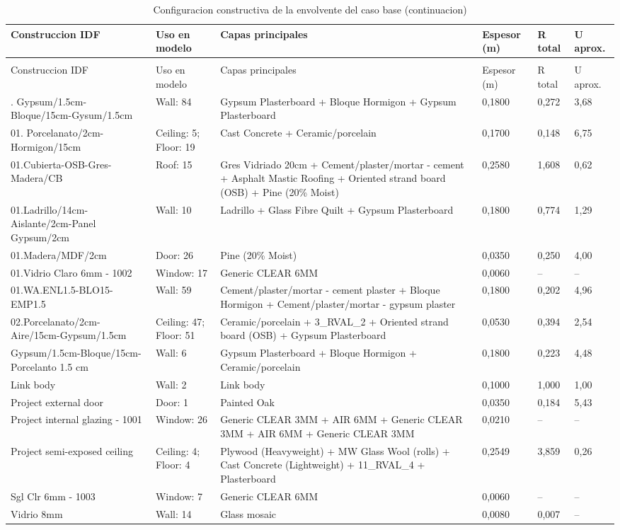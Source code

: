 {\fontsize{8}{10}\selectfont
\begin{longtable}{p{3.2cm}p{2.1cm}p{4.6cm}p{1.4cm}p{1.4cm}p{1.4cm}}
  \caption{Configuracion constructiva de la envolvente del caso base} \\
  \toprule
  Construccion IDF & Uso en modelo & Capas principales & Espesor (m) & R total & U aprox. \\
  \midrule
  \endfirsthead
  \caption[]{Configuracion constructiva de la envolvente del caso base (continuacion)} \\
  \toprule
  Construccion IDF & Uso en modelo & Capas principales & Espesor (m) & R total & U aprox. \\
  \midrule
  \endhead
  \bottomrule
  \endfoot
  01. Gypsum/1.5cm-Bloque/15cm-Gysum/1.5cm & Wall: 84 & Gypsum Plasterboard + Bloque Hormigon + Gypsum Plasterboard & 0,1800 & 0,272 & 3,68 \\
  01. Porcelanato/2cm-Hormigon/15cm & Ceiling: 5; Floor: 19 & Cast Concrete + Ceramic/porcelain & 0,1700 & 0,148 & 6,75 \\
  01.Cubierta-OSB-Gres-Madera/CB & Roof: 15 & Gres Vidriado 20cm + Cement/plaster/mortar - cement + Asphalt Mastic Roofing + Oriented strand board (OSB) + Pine (20\% Moist) & 0,2580 & 1,608 & 0,62 \\
  01.Ladrillo/14cm-Aislante/2cm-Panel Gypsum/2cm & Wall: 10 & Ladrillo + Glass Fibre Quilt + Gypsum Plasterboard & 0,1800 & 0,774 & 1,29 \\
  01.Madera/MDF/2cm & Door: 26 & Pine (20\% Moist) & 0,0350 & 0,250 & 4,00 \\
  01.Vidrio Claro 6mm - 1002 & Window: 17 & Generic CLEAR 6MM & 0,0060 & -- & -- \\
  01.WA.ENL1.5-BLO15-EMP1.5 & Wall: 59 & Cement/plaster/mortar - cement plaster + Bloque Hormigon + Cement/plaster/mortar - gypsum plaster & 0,1800 & 0,202 & 4,96 \\
  02.Porcelanato/2cm-Aire/15cm-Gypsum/1.5cm & Ceiling: 47; Floor: 51 & Ceramic/porcelain + 3\_RVAL\_2 + Oriented strand board (OSB) + Gypsum Plasterboard & 0,0530 & 0,394 & 2,54 \\
  Gypsum/1.5cm-Bloque/15cm-Porcelanto 1.5 cm & Wall: 6 & Gypsum Plasterboard + Bloque Hormigon + Ceramic/porcelain & 0,1800 & 0,223 & 4,48 \\
  Link body & Wall: 2 & Link body & 0,1000 & 1,000 & 1,00 \\
  Project external door & Door: 1 & Painted Oak & 0,0350 & 0,184 & 5,43 \\
  Project internal glazing - 1001 & Window: 26 & Generic CLEAR 3MM + AIR 6MM + Generic CLEAR 3MM + AIR 6MM + Generic CLEAR 3MM & 0,0210 & -- & -- \\
  Project semi-exposed ceiling & Ceiling: 4; Floor: 4 & Plywood (Heavyweight) + MW Glass Wool (rolls) + Cast Concrete (Lightweight) + 11\_RVAL\_4 + Plasterboard & 0,2549 & 3,859 & 0,26 \\
  Sgl Clr 6mm - 1003 & Window: 7 & Generic CLEAR 6MM & 0,0060 & -- & -- \\
  Vidrio 8mm & Wall: 14 & Glass mosaic & 0,0080 & 0,007 & -- \\
\end{longtable}
}

